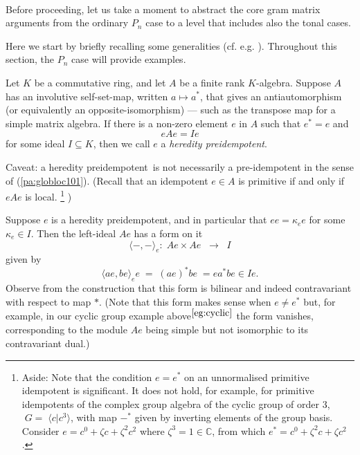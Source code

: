 \documentclass[reqno,10pt,a4paper]{amsart}
\newcommand{\C}{\mathbb{C}}
\newcommand{\beq}{\begin{equation}}
\newcommand{\eq}{\end{equation}}
\newcommand{\red}[1]{\textcolor{red}{#1}}
\newcommand{\ppm}[1]{\red{#1}}
\newcommand{\Gram}{\Gamma}
\begin{document}
$\;$

Before proceeding, let us take a moment to abstract the core gram matrix arguments 
from the ordinary $P_n$ case to a level that includes also the tonal cases.



\newcommand{\form}[1]{\langle #1 \rangle}
\newcommand{\bass}{\boldsymbol{\beta}}
\newcommand{\Gramb}{\Gram_{\bass}}
\newcommand{\rank}{{\mathrm{rank}}}
\newcommand{\LL}[1]{L^{#1}}
\newcommand{\head}{{\mathrm{head}}}

Here we start by briefly recalling some generalities (cf. e.g. \cite{amm2019tonal}). 
Throughout this section, the $P_n$ case will provide examples.

\newcommand{\herpre}{heredity preidempotent}

\mdef \label{pa:gram00}
Let $K$ be a commutative ring, and let $A$ be a finite rank $K$-algebra. 
Suppose $A$ has  an involutive %
self-set-map, written $a \mapsto a^*$, that gives an antiautomorphism
(or equivalently an opposite-isomorphism) --- such as the transpose map for a simple matrix algebra. 
If there 
is a non-zero element $e$ in $A$ such that $e^* = e$ and 
\beq   \label{eq:eAe=Ie}
eAe = Ie
\eq  
for some ideal $I \subseteq K$, then we call $e$ a {\em heredity preidempotent}.

Caveat: a \herpre\ is not necessarily a pre-idempotent in the sense of (\ref{pa:globloc101}).
%
{(Recall that an idempotent $e\in A$ is primitive if and only if $eAe$ is local.}
%
\footnote{ \label{eg:cyclic}
\newcommand{\za}{\zeta}
Aside: Note that the condition $e=e^*$ on an
unnormalised primitive idempotent is significant. 
It does not hold, for example,
for primitive idempotents of 
the complex group algebra of the cyclic group of order 3, 
$\; G = \; \langle c | c^3 \rangle$,
with map $-^*$ given by inverting elements of the group basis. 
Consider $e = c^0 + \za c +\za^2 c^2$ where $\za^3 = 1 \in \C$,
from which $e^* = c^0 +\za^2 c +\za c^2$.}%
)

Suppose $e$ is a heredity preidempotent, and 
in particular that $ee=\kappa_e e$ for some $\kappa_e \in I$. 
Then the left-ideal $Ae$ has a   %
form 
on it
$$
\langle -,- \rangle_e : \; Ae \times Ae  \;\; \rightarrow \;\; I
$$ 
given by 
\beq \label{form} 
\form{ae,be}_{{e}}e  \; =\; (ae)^* be \; = ea^* b e \in Ie  . 
\eq 
Observe from the construction that this form is bilinear and indeed contravariant
with respect to map $*$. 
(Note that this form makes sense when $e \neq e^*$ but, for example, in our cyclic group 
example above$^{\ref{eg:cyclic}}$ 
the form vanishes, corresponding to the module $Ae$ being simple but not isomorphic
to its contravariant dual.)
\end{document}
